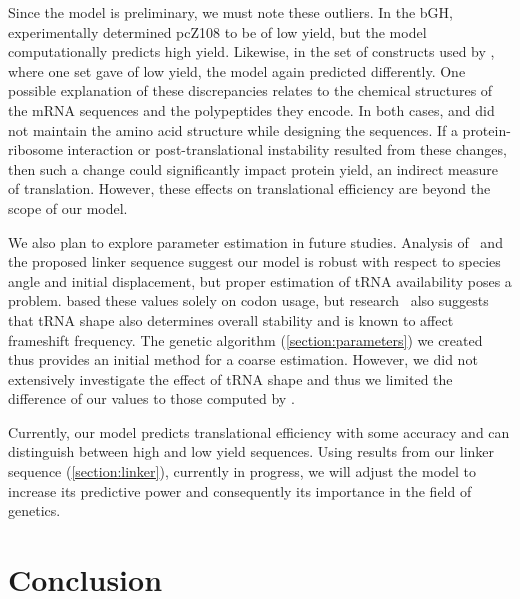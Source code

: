 \documentclass[12pt]{article}
\begin{document}
Since the model is preliminary, we must note these outliers.  In the
bGH, \citeauthor{schoner:bgh} experimentally determined pcZ108 to be
of low yield, but the model computationally predicts high yield.
Likewise, in the set of constructs used by \citet{weiss87}, where one
set gave of low yield, the model again predicted differently.  One
possible explanation of these discrepancies relates to the chemical
structures of the mRNA sequences and the polypeptides they
encode.  In both cases, \citeauthor{weiss87} and
\citeauthor{schoner:bgh} did not maintain the amino
acid structure while designing the sequences. If a protein-ribosome
interaction or post-translational instability resulted from these
changes, then such a change could significantly impact protein yield, an
indirect measure of translation. However, these effects on
translational efficiency are beyond the scope of our model.

We also plan to explore parameter estimation in future studies.
Analysis of \prfB\ and the
proposed linker sequence suggest our model is robust with respect to species angle
and initial displacement, but proper estimation of tRNA availability
poses a problem. \citet{lalit:mechanics} based these values solely on 
codon usage, but research~\cite{phelps} also suggests that tRNA shape
also determines overall stability and is known to affect
frameshift frequency. The
genetic algorithm (\autoref{section:parameters}) we created thus
provides an initial method for a coarse estimation. However, we did
not extensively investigate the effect of tRNA shape and thus we limited the
difference of our values to those computed by \citeauthor{lalit:mechanics}.

Currently, our model predicts translational efficiency with some
accuracy and can distinguish between high and low yield sequences. 
Using results from our linker sequence (\autoref{section:linker}), 
currently in progress, we will adjust the model to increase its 
predictive power and consequently its importance in the field of 
genetics.

\section{Conclusion}
\label{section:conclusion}
\end{document}
